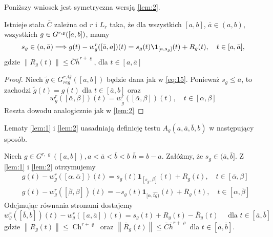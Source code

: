 \documentclass[oik, pdftex, robocza, man]{mgrwms}
\begin{document}
    Poniższy wniosek jest symetryczna wersją \eqref{lem:2}.

    \begin{cor}
        Istnieje stała $\bar{C}$ zależna od $r$ i $L_{r}$ taka, że dla wszystkich $[a,b]$, $\bar{a} \in (a,b)$, wszystkich $g \in G^{r,\varrho}([a,b])$, mamy
        \begin{equation*}
            s_{g} \in (a,\bar{a}) \Longrightarrow g(t)-w_{g}^{r}([\bar{a},a])(t)=s_{g}(t) \1_{\left[a,s_{g}\right]}(t)+R_{g}(t), \quad t \in[a,\bar{a}],
        \end{equation*}
        gdzie $\| R_{g}(t) \| \leq \bar{C}\bar{h}^{r+\varrho}$, dla $t \in [a,\bar{a}]$
    \end{cor}
    \begin{proof}
        Niech $\tilde{g} \in G_{reg}^{r, Q}([a, b])$ będzie dana jak w \eqref{eq:15}. Ponieważ $s_{g} \leq \bar{a}$, to zachodzi $\tilde{g}(t)=g(t)$ dla $t \in[\bar{a}, b]$ oraz
        \begin{equation*}
            w_{g}^{r}([\bar{\alpha}, \beta])(t)=w_{\tilde{g}}^{r}([\bar{\alpha}, \beta])(t), \quad t \in[\alpha, \beta]
        \end{equation*}
        Reszta dowodu analogicznie jak w \eqref{lem:2}
    \end{proof}

    Lematy \eqref{lem:1} i \eqref{lem:2} uasadniają definicję testu $A_{g}(a, \bar{a}, \bar{b}, b)$ w następujący sposób.

    Niech $g \in G^{r, \varrho}([a,b]), a<\bar{a}<\bar{b}<b$ $\bar{h}=b-a$. Załóżmy, że $s_{g} \in(\bar{a}, \bar{b}]$. Z \eqref{lem:1} i \eqref{lem:2} otrzymujemy
    \begin{equation*}
        \begin{aligned}
            &g(t)-w_{g}^{r}([\alpha, \bar{\alpha}])(t)=s_{g}(t) \mathbf{1}_{\left[s_{g}, \beta\right]}(t)+R_{g}(t), \quad t \in[\bar{\alpha}, \beta] \\
            &g(t)-w_{g}^{r}([\bar{\beta}, \beta])(t)=-s_{g}(t) \mathbf{1}_{[\alpha, \hat{t g})}(t)+\bar{R}_{g}(t), \quad t \in[\alpha, \bar{\beta}]
        \end{aligned}
    \end{equation*}
    Odejmując równania stronami dostajemy
    \begin{equation} \label{eq:16}
        w_{g}^{r}([\bar{b}, b])(t)-w_{g}^{r}([a, \bar{a}])(t)=s_{g}(t)+R_{g}(t)-\bar{R}_{g}(t) \quad \text{ dla }t \in[\bar{a}, \bar{b}]
    \end{equation}
    gdzie $\left\|R_{g}(t)\right\| \leq \operatorname{Ch}^{r+\varrho}$ oraz $\left\|\bar{R}_{g}(t)\right\| \leq \bar{C} \bar{h}^{r+\varrho}$ dla $t \in[\bar{a}, \bar{b}]$.
\end{document}
